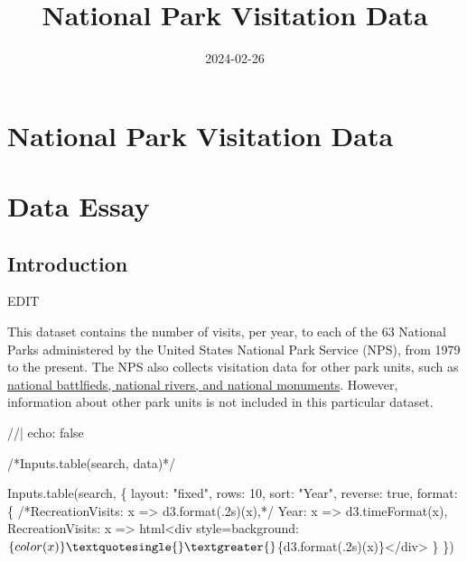 \documentclass[
  letterpaper,
  DIV=11,
  numbers=noendperiod]{scrartcl}
\title{National Park Visitation Data}
\author{}
\date{2024-02-26}
\newenvironment{Shaded}{\begin{snugshade}}{\end{snugshade}}
\newcommand{\NormalTok}[1]{\textcolor[rgb]{0.00,0.23,0.31}{#1}}
\renewcommand*\contentsname{Table of contents}
\newcommand\contentsname{Table of contents}
\begin{document}
\maketitle

\renewcommand*\contentsname{Table of Contents}
{
\hypersetup{linkcolor=}
\setcounter{tocdepth}{6}
\tableofcontents
}
\section{National Park Visitation
Data}\label{national-park-visitation-data}

\section{Data Essay}

\subsection{Introduction}\label{introduction}

EDIT

This dataset contains the number of visits, per year, to each of the 63
National Parks administered by the United States National Park Service
(NPS), from 1979 to the present. The NPS also collects visitation data
for other park units, such as
\href{(https://www.nps.gov/aboutus/national-park-system.htm)}{national
battlfieds, national rivers, and national monuments}. However,
information about other park units is not included in this particular
dataset.

\begin{Shaded}
\begin{Highlighting}[]
\NormalTok{//| echo: false}

\NormalTok{/*Inputs.table(search, data)*/}

\NormalTok{Inputs.table(search, \{}
\NormalTok{  layout: "fixed",}
\NormalTok{  rows: 10,}
\NormalTok{  sort: "Year",}
\NormalTok{  reverse: true,}
\NormalTok{  format: \{}
\NormalTok{    /*RecreationVisits: x =\textgreater{} d3.format(\textquotesingle{}.2s\textquotesingle{})(x),*/}
\NormalTok{    Year: x =\textgreater{} d3.timeFormat(x),}
\NormalTok{    RecreationVisits: x =\textgreater{} html\textasciigrave{}\textless{}div style=\textquotesingle{}background:$\{color(x)\}\textquotesingle{}\textgreater{}$\{d3.format(\textquotesingle{}.2s\textquotesingle{})(x)\}\textless{}/div\textgreater{}\textasciigrave{}}
\NormalTok{  \}}
\NormalTok{\})}
\end{Highlighting}
\end{Shaded}
\end{document}

